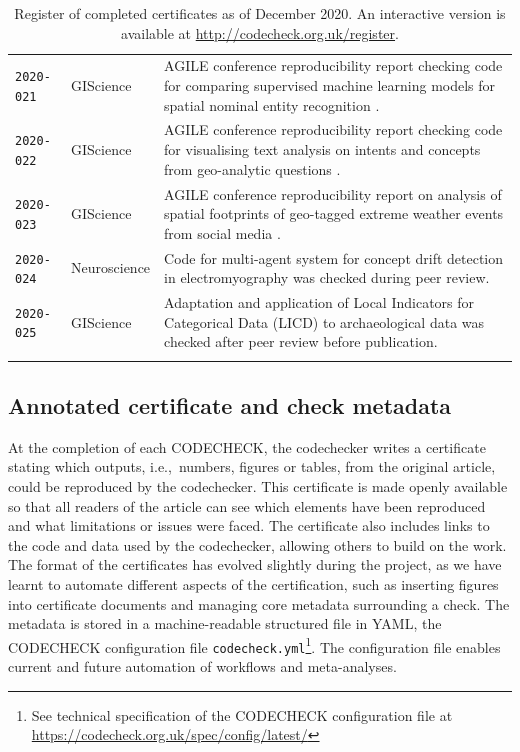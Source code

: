 \documentclass[12pt]{article}
\begin{document}
\begin{table}
\begin{tabular}{llp{12cm}}
    \texttt{2020-021}  \cite{cert-2020-021} & GIScience & AGILE conference reproducibility report checking code for comparing supervised machine learning models for spatial nominal entity recognition \cite{Medad2020}. \\ %
    \texttt{2020-022}  \cite{cert-2020-022} & GIScience & AGILE conference reproducibility report checking code for visualising text analysis on intents and concepts from geo-analytic questions \cite{Xu2020}. \\ %
    \texttt{2020-023}  \cite{cert-2020-023} & GIScience & AGILE conference reproducibility report on analysis of spatial footprints of geo-tagged extreme weather events from social media \cite{Owuor2020}. \\
    \texttt{2020-024}  \cite{cert-2020-024} & Neuroscience & Code for multi-agent system for concept drift detection in electromyography \cite{vieira_driftage_2020} was checked during peer review. \\ %
    \texttt{2020-025}  \cite{cert-2020-025} & GIScience & Adaptation and application of Local Indicators for Categorical Data (LICD) to archaeological data \cite{carrer_application_2021} was checked after peer review before publication. \\ %
    \\ \bottomrule
  \end{tabular}
  \caption{Register of completed certificates as of December 2020.  An interactive version
  is available at \url{http://codecheck.org.uk/register}.
  }
  \label{tab:register}
\end{table}

\subsection*{Annotated certificate and check metadata}\label{annotated-certificate}

At the completion of each CODECHECK, the codechecker writes a certificate
stating which outputs, i.e.,~numbers, figures or tables, from the 
original article, could be reproduced by the codechecker.
This certificate is made openly
available so that all readers of the article can see which elements
have been reproduced and what limitations or issues were faced.
The certificate also includes links to the code
and data used by the codechecker, allowing others to build on the
work.
The format of the certificates has evolved slightly during the
project, as we have learnt to automate different aspects of the
certification, such as inserting figures into certificate documents
and managing core metadata surrounding a check.
The metadata is stored in a machine-readable structured file in YAML,
the CODECHECK configuration file \texttt{codecheck.yml}\footnote{
See technical specification of the CODECHECK configuration file at
\url{https://codecheck.org.uk/spec/config/latest/}}.
The configuration file enables current and future automation of workflows and
meta-analyses.
\end{document}
